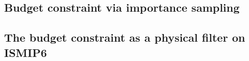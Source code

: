 \documentclass[11pt]{article}
\begin{document}
\subsection{Budget constraint via importance sampling}
\label{sec:budget}
%
%
%
%
%
%

\subsection{The budget constraint as a physical filter on ISMIP6}
\label{sec:filter}
%
%
%
%
%
%
\end{document}
